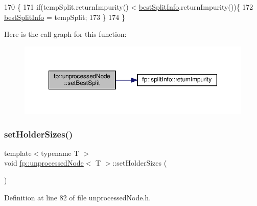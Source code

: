 \begin{DoxyCode}
170                                                                 \{
171                     \textcolor{keywordflow}{if}(tempSplit.returnImpurity() < \hyperlink{classfp_1_1unprocessedNode_a9146bd750d1f533e712634873551d060}{bestSplitInfo}.returnImpurity())\{
172                         \hyperlink{classfp_1_1unprocessedNode_a9146bd750d1f533e712634873551d060}{bestSplitInfo} = tempSplit;
173                     \}
174                 \}
\end{DoxyCode}
Here is the call graph for this function\+:\nopagebreak
\begin{figure}[H]
\begin{center}
\leavevmode
\includegraphics[width=350pt]{classfp_1_1unprocessedNode_ae7ad0b6bf8142ea5d3d851e29b5b9aee_cgraph}
\end{center}
\end{figure}
\mbox{\label{classfp_1_1unprocessedNode_ae1aa4f8f868fe19c8e48d3fe1e5596a8}} 
\subsubsection{\texorpdfstring{set\+Holder\+Sizes()}{setHolderSizes()}}
{\footnotesize\ttfamily template$<$typename T $>$ \\
void \hyperlink{classfp_1_1unprocessedNode}{fp\+::unprocessed\+Node}$<$ T $>$\+::set\+Holder\+Sizes (\begin{DoxyParamCaption}{ }\end{DoxyParamCaption})\hspace{0.3cm}{\ttfamily [inline]}}



Definition at line 82 of file unprocessed\+Node.\+h.


